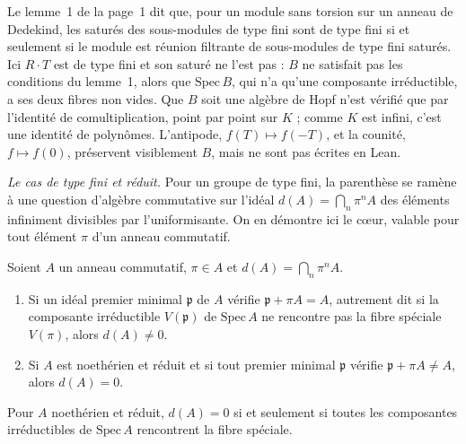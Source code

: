 \begin{remarque}
Le lemme~1 de la page~1 dit que, pour un module sans torsion sur un anneau de Dedekind, les saturés des sous-modules de type fini sont de type fini si et seulement si le module est réunion filtrante de sous-modules de type fini saturés. Ici $R \cdot T$ est de type fini et son saturé ne l'est pas : $B$ ne satisfait pas les conditions du lemme~1, alors que $\mathrm{Spec}\,B$, qui n'a qu'une composante irréductible, a ses deux fibres non vides. Que $B$ soit une algèbre de Hopf n'est vérifié que par l'identité de comultiplication, point par point sur $K$ ; comme $K$ est infini, c'est une identité de polynômes. L'antipode, $f(T) \mapsto f(-T)$, et la counité, $f \mapsto f(0)$, préservent visiblement $B$, mais ne sont pas écrites en Lean.
\end{remarque}

\noindent\emph{Le cas de type fini et réduit.} Pour un groupe de type fini, la parenthèse se ramène à une question d'algèbre commutative sur l'idéal $d(A) = \bigcap_n \pi^n A$ des éléments infiniment divisibles par l'uniformisante. On en démontre ici le cœur, valable pour tout élément $\pi$ d'un anneau commutatif.

\begin{encadre}
\begin{enonce}
Soient $A$ un anneau commutatif, $\pi \in A$ et $d(A) = \bigcap_{n} \pi^n A$.
\begin{enumerate}
\item[(a)] Si un idéal premier minimal $\mathfrak p$ de $A$ vérifie $\mathfrak p + \pi A = A$, autrement dit si la composante irréductible $V(\mathfrak p)$ de $\mathrm{Spec}\,A$ ne rencontre pas la fibre spéciale $V(\pi)$, alors $d(A) \neq 0$.
\item[(b)] Si $A$ est noethérien et réduit et si tout premier minimal $\mathfrak p$ vérifie $\mathfrak p + \pi A \neq A$, alors $d(A) = 0$.
\end{enumerate}
Pour $A$ noethérien et réduit, $d(A) = 0$ si et seulement si toutes les composantes irréductibles de $\mathrm{Spec}\,A$ rencontrent la fibre spéciale.
\end{enonce}
\end{encadre}

